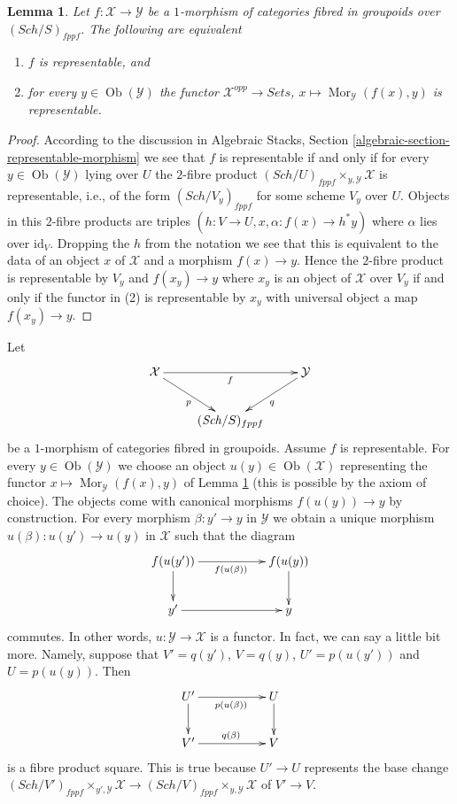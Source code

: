 \documentclass{stacks-project}
\theoremstyle{plain}
\newtheorem{lemma}[subsection]{Lemma}
\theoremstyle{definition}
\theoremstyle{remark}
\numberwithin{equation}{subsection}
\def\Sch{\mathit{Sch}}
\def\Mor{\mathop{\mathrm{Mor}}\nolimits}
\def\Ob{\mathop{\mathrm{Ob}}\nolimits}
\begin{document}
\begin{lemma}
\label{lemma-representable}
Let $f : \mathcal{X} \to \mathcal{Y}$ be a $1$-morphism of categories
fibred in groupoids over $(\Sch/S)_{fppf}$. The following are
equivalent
\begin{enumerate}
\item $f$ is representable, and
\item for every $y \in \Ob(\mathcal{Y})$ the functor
$\mathcal{X}^{opp} \to \textit{Sets}$,
$x \mapsto \Mor_\mathcal{Y}(f(x), y)$
is representable.
\end{enumerate}
\end{lemma}

\begin{proof}
According to the discussion in
Algebraic Stacks, Section \ref{algebraic-section-representable-morphism}
we see that $f$ is representable if and only if
for every $y \in \Ob(\mathcal{Y})$
lying over $U$ the $2$-fibre product
$(\Sch/U)_{fppf} \times_{y, \mathcal{Y}} \mathcal{X}$
is representable, i.e., of the form $(\Sch/V_y)_{fppf}$ for some
scheme $V_y$ over $U$. Objects in this $2$-fibre products are triples
$(h : V \to U, x, \alpha : f(x) \to h^*y)$ where $\alpha$ lies
over $\text{id}_V$. Dropping the $h$ from the notation we see that this
is equivalent to the data of an object $x$ of $\mathcal{X}$ and a
morphism $f(x) \to y$. Hence the $2$-fibre product is
representable by $V_y$ and $f(x_y) \to y$ where $x_y$ is an object
of $\mathcal{X}$ over $V_y$ if and only if the functor in (2) is representable
by $x_y$ with universal object a map $f(x_y) \to y$.
\end{proof}

\noindent
Let
$$
\xymatrix{
\mathcal{X} \ar[rr]_f \ar[rd]_p & &  \mathcal{Y} \ar[ld]^q \\
& (\Sch/S)_{fppf}
}
$$
be a $1$-morphism of categories fibred in groupoids. Assume $f$ is
representable. For every $y \in \Ob(\mathcal{Y})$ we choose
an object $u(y) \in \Ob(\mathcal{X})$ representing the functor
$x \mapsto \Mor_\mathcal{Y}(f(x), y)$ of
Lemma \ref{lemma-representable}
(this is possible by the axiom of choice).
The objects come with canonical morphisms $f(u(y)) \to y$ by
construction.
For every morphism $\beta : y' \to y$ in $\mathcal{Y}$ we obtain a unique
morphism $u(\beta) : u(y') \to u(y)$ in $\mathcal{X}$ such that the diagram
$$
\xymatrix{
f(u(y')) \ar[d] \ar[rr]_{f(u(\beta))} & & f(u(y)) \ar[d] \\
y' \ar[rr] & & y
}
$$
commutes. In other words, $u : \mathcal{Y} \to \mathcal{X}$ is a functor.
In fact, we can say a little bit more. Namely, suppose that
$V' = q(y')$, $V = q(y)$, $U' = p(u(y'))$ and $U = p(u(y))$. Then
$$
\xymatrix{
U' \ar[rr]_{p(u(\beta))} \ar[d] & & U \ar[d] \\
V' \ar[rr]^{q(\beta)} & & V
}
$$
is a fibre product square. This is true because $U' \to U$ represents
the base change
$(\Sch/V')_{fppf} \times_{y', \mathcal{Y}} \mathcal{X} \to
(\Sch/V)_{fppf} \times_{y, \mathcal{Y}} \mathcal{X}$
of $V' \to V$.
\end{document}
